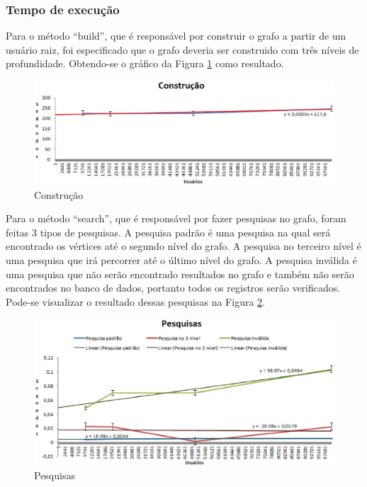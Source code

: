 \subsubsection{Tempo de execução}

Para o método ``build'', que é responsável por construir o grafo a partir de um usuário raiz, foi especificado que o grafo deveria ser construido com três níveis de profundidade. Obtendo-se o gráfico da Figura \ref{build_tempo} como resultado.

\begin{figure}[!h]
	\centering
	\includegraphics[scale=0.8]{figuras/capitulo7/graficos/network/tempo/build.eps}
	\caption[Construção]{Construção}
	\label{build_tempo}
\end{figure}

Para o método ``search'', que é responsável por fazer pesquisas no grafo, foram feitas 3 tipos de pesquisas. A pesquisa padrão é uma pesquisa na qual será encontrado os vértices até o segundo nível do grafo. A pesquisa no terceiro nível é uma pesquisa que irá percorrer até o último nível do grafo. A pesquisa inválida é uma pesquisa que não serão encontrado resultados no grafo e também não serão encontrados no banco de dados, portanto todos os registros serão verificados. Pode-se visualizar o resultado dessas pesquisas na Figura \ref{search_tempo}.

\newpage

\begin{figure}[!h]
	\centering
	\includegraphics[scale=0.8]{figuras/capitulo7/graficos/network/tempo/pesquisas.eps}
	\caption[Pesquisas]{Pesquisas}
	\label{search_tempo}
\end{figure}

